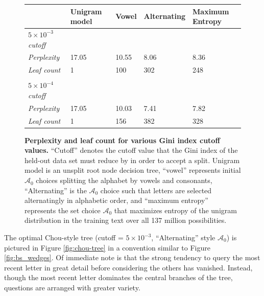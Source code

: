 \documentclass[12pt]{article}
\begin{document}
\begin{figure}
  \centering
  \begin{tabularx}{\textwidth}{ lXXXX }
    & Unigram model & Vowel & Alternating & Maximum Entropy \\
    \toprule
    \textit{$5\times10^{-3}$ cutoff} & & & & \\
    \midrule
    \textit{Perplexity} & 17.05 & 10.55 & 8.06 & 8.36 \\
    \textit{Leaf count} & 1     & 100   & 302  & 248  \\
    \\
    \textit{$5\times10^{-4}$ cutoff} & & & & \\
    \midrule
    \textit{Perplexity} & 17.05 & 10.03 & 7.41 & 7.82 \\
    \textit{Leaf count} & 1     & 156   & 382  & 328  \\
    \bottomrule
  \end{tabularx}
  \caption{\textbf{Perplexity and leaf count for various Gini index
      cutoff values.} ``Cutoff'' denotes the cutoff value that the
    Gini index of the held-out data set must reduce by in order to
    accept a split. Unigram model is an unsplit root node decision
    tree, ``vowel'' represents initial $\mathcal{A}_0$ choices
    splitting the alphabet by vowels and consonants, ``Alternating''
    is the $\mathcal{A}_0$ choice such that letters are selected
    alternatingly in alphabetic order, and ``maximum entropy''
    represents the set choice $\mathcal{A}_0$ that maximizes entropy
    of the unigram distribution in the training text over all 137
    million possibilities.}
  \label{fig:stop-cutoff}
\end{figure}

The optimal Chou-style tree (cutoff = $5\times10^{-3}$,
``Alternating'' style $\mathcal{A}_0$) is pictured in Figure
\ref{fig:chou-tree} in a convention similar to Figure
\ref{fig:bs_wedges}. Of immediate note is that the strong tendency to
query the most recent letter in great detail before considering the
others has vanished. Instead, though the most recent letter dominates
the central branches of the tree, questions are arranged with greater
variety. 
\end{document}
